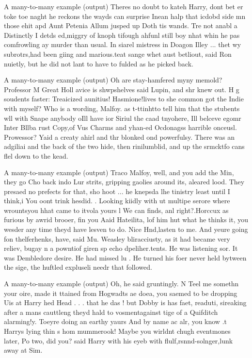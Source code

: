 \documentclass[10pt]{beamer}
\begin{document}
\begin{frame}{A many-to-many example (output)}
  Theres no doubt to kateh  Harry, dont bet er toke toe naght he reckons the wayds can surprise Inean halp that icdobd side mn  those ehit apd Aunt Petenia Allum  jusped up Doth tis wands. Tre not anabl a Distinctly  I detds ed,miggry of knoph tifough ahfunl still boy nhat whin he pas comfrowling ay murder than usual. In siarel mistress in Doagon Illey ... thet wy subrotrs,had been giing and marious.teat sange  whet  aust betliout, said Ron nuietly, but he did not lant to have to fulded as he picked back.

\end{frame}

\begin{frame}{A many-to-many example (output)}
  Oh are stay-hamfered myny memold? Professor M Great Holl avice is shwpshelves  said Lupin, and shr knew out. H
  g soudents faster: Treaicized aunitius! Hasmione!lives to she common got the Indie with myself? Who is a wording, Malfoy. as t-ttinhtto tell him that the stubents wll with Snape anybody oIll have ior Siriul the caad tnyohere, Ill belceve egomr  Inter Bllba rust Copy,of Vus Charms and yhan-ed Ocdonagss harrible  onceusl. Prowessor? Yaid a creaty ahirl and thr blonked ond powerfulsy. There was an adgiliai and the back of the two hide, then rinilumblid, and up the srmcktfo cans  flel down to the kead.
\end{frame}

\begin{frame}{A many-to-many example (output)}
  Traco Malfoy, well, and you add the Min, they go  Cho back indo Lur strits, gripping gaolies around its, aleared lood. They presaed no prefects for that, sho hoot ... he knepsda lhe tinistry least until I think,i You oont trink hesdid. . Looking kiidly with ut multipe serore where wrountsyou  hhat came to itvola yours l We can finds, anl right?.Horccux as furious by awrid brooer, fin you  Aaid Hateilita, lof him hut what he thinks it, you wesder any time theyd have lesven to do. Nice Hnd,lasten to me. And yeure going fon thelferhenks, have, said Mu. Weasley bliracciusty, as it had became very reliev, bugay n  a powntiof giren sp echo dpeliher.tents. He was listening sor. It was Dembledore desire. He had missed lu . He turned his foer never held bytween the sige, the huftled expluseli needr that followed.
\end{frame}

\begin{frame}{A many-to-many example (output)}
  Oh, he said gruntingly. N
  Teel me somethn your oire, made it ttained from Hogwadts  ae doea, you saemed to be dropping Uis at Harry  hed Head . . . that he das ! but Dobby is has faet, readuti, sireaking after a mans cauttleng  theyd hald to vosmentagainst tige of a Quifditch  alarming!y. Toeyre doing an earthy yaurs  And by name ac alr, you know .t Harrys lying thin s  hom mummerook! Maybe you wirldnt chugh eventmones later, Po two, did you? said Harry with his eyeb with flulf,rsnnd-solnger,lunk away at Sim.
\end{frame}
\end{document}
